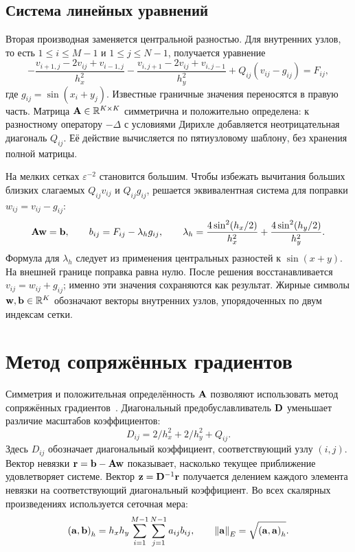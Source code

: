 \subsection{Система линейных уравнений}

Вторая производная заменяется центральной разностью.
Для внутренних узлов, то есть $1\leq i\leq M-1$ и $1\leq j\leq N-1$, получается уравнение
\begin{equation}
    -\frac{v_{i+1,j}-2v_{ij}+v_{i-1,j}}{h_x^2}
    -\frac{v_{i,j+1}-2v_{ij}+v_{i,j-1}}{h_y^2}
    +Q_{ij}(v_{ij}-g_{ij})=F_{ij},
    \label{eq:stencil}
\end{equation}
где $g_{ij}=\sin(x_i+y_j)$.
Известные граничные значения переносятся в правую часть.
Матрица $\mathbf{A}\in\mathbb R^{K\times K}$ симметрична и положительно определена: к разностному оператору $-\Delta$ с условиями Дирихле добавляется неотрицательная диагональ $Q_{ij}$.
Её действие вычисляется по пятиузловому шаблону, без хранения полной матрицы.

На мелких сетках $\varepsilon^{-2}$ становится большим.
Чтобы избежать вычитания больших близких слагаемых $Q_{ij}v_{ij}$ и $Q_{ij}g_{ij}$, решается эквивалентная система для поправки $w_{ij}=v_{ij}-g_{ij}$:
\begin{equation}
    \mathbf{A}\mathbf{w}=\mathbf{b},\qquad
    b_{ij}=F_{ij}-\lambda_h g_{ij},\qquad
    \lambda_h=\frac{4\sin^2(h_x/2)}{h_x^2}
    +\frac{4\sin^2(h_y/2)}{h_y^2}.
    \label{eq:shifted}
\end{equation}
Формула для $\lambda_h$ следует из применения центральных разностей к $\sin(x+y)$.
На внешней границе поправка равна нулю.
После решения восстанавливается $v_{ij}=w_{ij}+g_{ij}$; именно эти значения сохраняются как результат.
Жирные символы $\mathbf{w},\mathbf{b}\in\mathbb R^K$ обозначают векторы внутренних узлов, упорядоченных по двум индексам сетки.

\section{Метод сопряжённых градиентов}

Симметрия и положительная определённость $\mathbf{A}$ позволяют использовать метод сопряжённых градиентов~\cite{cg}.
Диагональный предобуславливатель $\mathbf{D}$ уменьшает различие масштабов коэффициентов:
\begin{equation}
    D_{ij}=2/h_x^2+2/h_y^2+Q_{ij}.
\end{equation}
Здесь $D_{ij}$ обозначает диагональный коэффициент, соответствующий узлу $(i,j)$.
Вектор невязки $\mathbf{r}=\mathbf{b}-\mathbf{A}\mathbf{w}$ показывает, насколько текущее приближение удовлетворяет системе.
Вектор $\mathbf{z}=\mathbf{D}^{-1}\mathbf{r}$ получается делением каждого элемента невязки на соответствующий диагональный коэффициент.
Во всех скалярных произведениях используется сеточная мера:
\begin{equation}
    \left(\mathbf{a},\mathbf{b}\right)_h=h_xh_y\sum_{i=1}^{M-1}\sum_{j=1}^{N-1}a_{ij}b_{ij},
    \qquad \left\lVert \mathbf{a}\right\rVert_E=\sqrt{\left(\mathbf{a},\mathbf{a}\right)_h}.
\end{equation}

